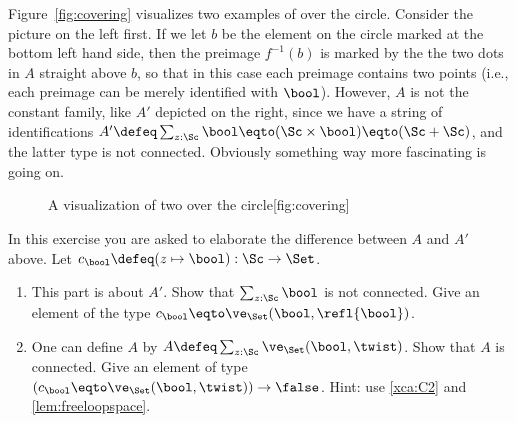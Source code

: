 Figure~\ref{fig:covering} visualizes two examples of \coverings over the circle.
Consider the picture on the left first.
If we let $b$ be the element on the circle marked at the bottom left hand side,
then the preimage $f^{-1}(b)$ is marked by the the two dots
in $A$ straight above $b$, so that in this case each preimage contains
two points (i.e., each preimage can be merely identified with $\bool$).
However, $A$ is not the constant family, like $A'$ depicted on the right,
since we have a string of identifications
$A'\defeq\sum_{z:\Sc}\bool\eqto(\Sc\times\bool)\eqto(\Sc+\Sc)$,
and the latter type is not connected.
Obviously something way more fascinating is going on.

\begin{figure}[hbt]
  \begin{sidecaption}%
    {A visualization of two \coverings over the circle}[fig:covering]
  \centering
  \end{sidecaption}
\end{figure}

\begin{xca}\label{xca:twoS1coverings}
In this exercise you are asked to elaborate the difference
between $A$ and $A'$ above.
Let $c_\bool \defeq (z\mapsto\bool): \Sc\to\Set$.
\begin{enumerate}
\item
This part is about $A'$. Show that $\sum_{z:\Sc}\bool$ is not connected.
Give an element of the type $c_\bool\eqto\ve_\Set(\bool,\refl{\bool})$.
\item
One can define $A$ by $A\defeq\sum_{z:\Sc}\ve_\Set(\bool,\twist)$.
Show that $A$ is connected.
Give an element of type $(c_\bool\eqto\ve_\Set(\bool,\twist))\to\false$.
Hint: use \cref{xca:C2} and \cref{lem:freeloopspace}.\qedhere
\end{enumerate}
\end{xca}

